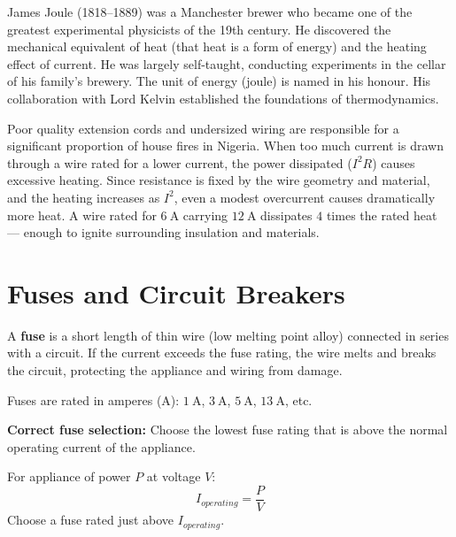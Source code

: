 \begin{historybox}
James Joule (1818--1889) was a Manchester brewer who
became one of the greatest experimental physicists
of the 19th century. He discovered the mechanical
equivalent of heat (that heat is a form of energy)
and the heating effect of current. He was largely
self-taught, conducting experiments in the cellar
of his family's brewery. The unit of energy (joule)
is named in his honour. His collaboration with Lord
Kelvin established the foundations of thermodynamics.
\end{historybox}

\begin{realworldbox}
Poor quality extension cords and undersized wiring
are responsible for a significant proportion of house
fires in Nigeria. When too much current is drawn
through a wire rated for a lower current, the power
dissipated ($I^2R$) causes excessive heating. Since
resistance is fixed by the wire geometry and material,
and the heating increases as $I^2$, even a modest
overcurrent causes dramatically more heat. A wire
rated for $6\ \text{A}$ carrying $12\ \text{A}$
dissipates $4$ times the rated heat --- enough to
ignite surrounding insulation and materials.
\end{realworldbox}

\section{Fuses and Circuit Breakers}

\begin{definitionbox}[Fuse]
A \textbf{fuse} is a short length of thin wire
(low melting point alloy) connected in series with
a circuit. If the current exceeds the fuse rating,
the wire melts and breaks the circuit, protecting
the appliance and wiring from damage.

Fuses are rated in amperes (A): $1\ \text{A}$,
$3\ \text{A}$, $5\ \text{A}$, $13\ \text{A}$, etc.

\textbf{Correct fuse selection:} Choose the lowest
fuse rating that is above the normal operating
current of the appliance.

For appliance of power $P$ at voltage $V$:
\[
  I_{operating} = \frac{P}{V}
\]
Choose a fuse rated just above $I_{operating}$.
\end{definitionbox}

